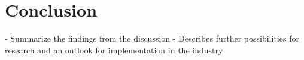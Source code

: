 \section{Conclusion}\label{conclusion}

- Summarize the findings from the discussion
- Describes further possibilities for research and an outlook for implementation in the industry
